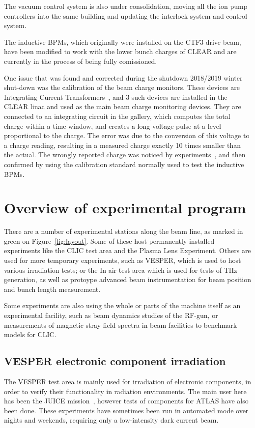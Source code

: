 \documentclass[a4paper,
               keeplastbox,   %
               ]{jacow}
\begin{document}
The vacuum control system is also under consolidation, moving all the ion pump controllers into the same building and updating the interlock system and control system.

The inductive BPMs, which originally were installed on the CTF3 drive beam, have been modified to work with the lower bunch charges of CLEAR and are currently in the process of being fully comissioned.

One issue that was found and corrected during the shutdown 2018/2019 winter shut-down was the calibration of the beam charge monitors.
These devices are Integrating Current Transformers~\cite{BergozICT}, and 3 such devices are installed in the CLEAR linac and used as the main beam charge monitoring devices.
They are connected to an integrating circuit in the gallery, which computes the total charge within a time-window, and creates a long voltage pulse at a level proportional to the charge.
The error was due to the conversion of this voltage to a charge reading, resulting in a measured charge exactly 10 times smaller than the actual.
The wrongly reported charge was noticed by experiments~\cite{MarisTali:E-SEU,Antonio::IEEE-Kicks}, and then confirmed by using the calibration standard normally used to test the inductive BPMs.


\section{Overview of experimental program}

There are a number of experimental stations along the beam line, as marked in green on Figure~\ref{fig:layout}.
Some of these host permanently installed experiments like the CLIC test area and the Plasma Lens Experiment.
Others are used for more temporary experiments, such as VESPER, which is used to host various irradiation tests; or the In-air test area which is used for tests of THz generation, as well as protoype advanced beam instrumentation for beam position and bunch length measurement.

Some experiments are also using the whole or parts of the machine itself as an experimental facility, such as beam dynamics studies of the RF-gun, or measurements of magnetic stray field spectra in beam facilities to benchmark models for CLIC.

\subsection{VESPER electronic component irradiation}
The VESPER test area is mainly used for irradiation of electronic components, in order to verify their functionality in radiation environments.
The main user here has been the JUICE mission~\cite{MarisTali:E-SEU,MarisTali:E-SEL,RubenAlia::CLEARrev}, however tests of components for ATLAS have also been done.
These experiments have sometimes been run in automated mode over nights and weekends, requiring only a low-intensity dark current beam.
\end{document}
